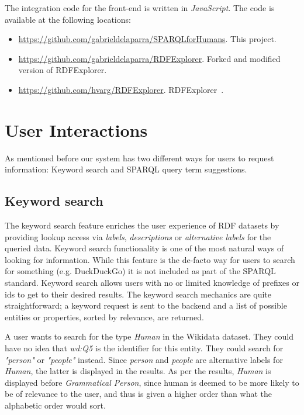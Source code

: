 The integration code for the front-end is written in \textit{JavaScript}. The code is available at the following locations:
\begin{itemize}
    \item \url{https://github.com/gabrieldelaparra/SPARQLforHumans}. This project.
    \item \url{https://github.com/gabrieldelaparra/RDFExplorer}. Forked and modified version of RDFExplorer.
    \item \url{https://github.com/hvarg/RDFExplorer}. RDFExplorer~\cite{Vargas2019}.
\end{itemize}

\section{User Interactions}

As mentioned before our system has two different ways for users to request information: 
Keyword search 
and SPARQL query term suggestions.

\subsection{Keyword search}

The keyword search feature enriches the user experience of RDF datasets by providing lookup access via \textit{labels}, \textit{descriptions} or \textit{alternative labels} for the queried data. 
Keyword search functionality is one of the most natural ways of looking for information. 
While this feature is the de-facto way for users to search for something (e.g. DuckDuckGo) it is not included as part of the SPARQL standard. 
Keyword search allows users with no or limited knowledge of prefixes or ids to get to their desired results. 
The keyword search mechanics are quite straightforward; a keyword request is sent to the backend and a list of possible entities or properties, sorted by relevance, are returned. 

\begin{example}
A user wants to search for the type \textit{Human} in the Wikidata dataset. 
They could have no idea that \textit{wd:Q5} is the identifier for this entity. 
They could search for \textit{"person"} or \textit{"people"} instead. 
Since \textit{person} and \textit{people} are alternative labels for \textit{Human}, the latter is displayed in the results. 
As per the results, \textit{Human} is displayed before \textit{Grammatical Person}, since human is deemed to be more likely to be of relevance to the user, and thus is given a higher order than what the alphabetic order would sort.
\end{example}

